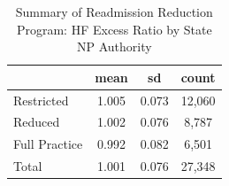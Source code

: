 \begin{table}[htbp]\centering
\def\sym#1{\ifmmode^{#1}\else\(^{#1}\)\fi}
\caption{Summary of Readmission Reduction Program: HF Excess Ratio by State NP Authority}
\begin{tabular}{l*{1}{ccc}}
\toprule
                    &        mean&          sd&       count\\
\midrule
Restricted          &       1.005&       0.073&      12,060\\
Reduced             &       1.002&       0.076&       8,787\\
Full Practice       &       0.992&       0.082&       6,501\\
Total               &       1.001&       0.076&      27,348\\
\bottomrule
\end{tabular}
\end{table}
